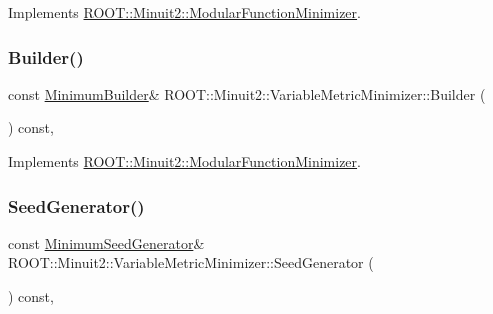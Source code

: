 Implements \mbox{\hyperlink{classROOT_1_1Minuit2_1_1ModularFunctionMinimizer_a13e98551cf14e927c61e1e34ecf8ba8b}{R\+O\+O\+T\+::\+Minuit2\+::\+Modular\+Function\+Minimizer}}.

\mbox{\label{classROOT_1_1Minuit2_1_1VariableMetricMinimizer_aa31a52e431960a91acf0b9c2997b397b}} 
\subsubsection{\texorpdfstring{Builder()}{Builder()}\hspace{0.1cm}{\footnotesize\ttfamily [2/2]}}
{\footnotesize\ttfamily const \mbox{\hyperlink{classROOT_1_1Minuit2_1_1MinimumBuilder}{Minimum\+Builder}}\& R\+O\+O\+T\+::\+Minuit2\+::\+Variable\+Metric\+Minimizer\+::\+Builder (\begin{DoxyParamCaption}{ }\end{DoxyParamCaption}) const\hspace{0.3cm}{\ttfamily [inline]}, {\ttfamily [virtual]}}



Implements \mbox{\hyperlink{classROOT_1_1Minuit2_1_1ModularFunctionMinimizer_a13e98551cf14e927c61e1e34ecf8ba8b}{R\+O\+O\+T\+::\+Minuit2\+::\+Modular\+Function\+Minimizer}}.

\mbox{\label{classROOT_1_1Minuit2_1_1VariableMetricMinimizer_a8ac2123142283dd05611842236caeadb}} 
\subsubsection{\texorpdfstring{SeedGenerator()}{SeedGenerator()}\hspace{0.1cm}{\footnotesize\ttfamily [1/2]}}
{\footnotesize\ttfamily const \mbox{\hyperlink{classROOT_1_1Minuit2_1_1MinimumSeedGenerator}{Minimum\+Seed\+Generator}}\& R\+O\+O\+T\+::\+Minuit2\+::\+Variable\+Metric\+Minimizer\+::\+Seed\+Generator (\begin{DoxyParamCaption}{ }\end{DoxyParamCaption}) const\hspace{0.3cm}{\ttfamily [inline]}, {\ttfamily [virtual]}}



